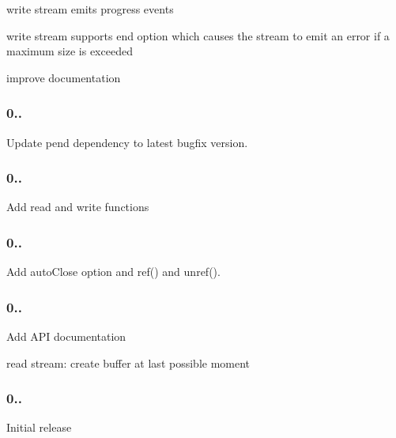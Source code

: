\begin{DoxyItemize}
\item write stream emits \textquotesingle{}progress\textquotesingle{} events
\item write stream supports \textquotesingle{}end\textquotesingle{} option which causes the stream to emit an error if a maximum size is exceeded
\item improve documentation
\end{DoxyItemize}

\subsubsection*{0..}


\begin{DoxyItemize}
\item Update pend dependency to latest bugfix version.
\end{DoxyItemize}

\subsubsection*{0..}


\begin{DoxyItemize}
\item Add read and write functions
\end{DoxyItemize}

\subsubsection*{0..}


\begin{DoxyItemize}
\item Add {\ttfamily auto\+Close} option and {\ttfamily ref()} and {\ttfamily unref()}.
\end{DoxyItemize}

\subsubsection*{0..}


\begin{DoxyItemize}
\item Add A\+PI documentation
\item read stream\+: create buffer at last possible moment
\end{DoxyItemize}

\subsubsection*{0..}


\begin{DoxyItemize}
\item Initial release 
\end{DoxyItemize}